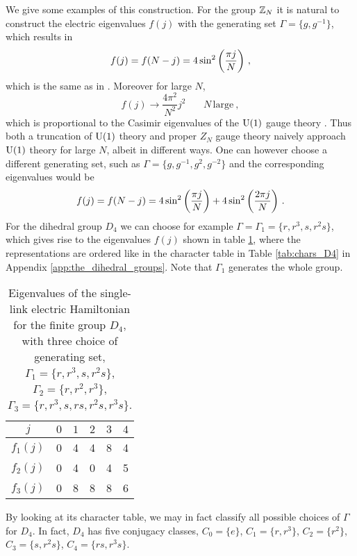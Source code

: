 We give some examples of this construction.
For the group $\mathbb{Z}_N$ it is natural to construct the electric eigenvalues $f(j)$ with the generating set $\Gamma = \{g, g^{-1}\}$, which results in
\begin{equation}
    \label{eq:fj ZN}
    f(j)=f(N-j) = 4\sin^2\pqty{\frac{\pi j}{N}} \ ,
\end{equation}
which is the same as in \cite{Ercoetal1}.
Moreover for large $N$,
\begin{equation}
    f(j) \to \frac{4\pi^2}{N^2} j^2\,\,\,\,\,\,\,\,\,\,\,N\,\mathrm{large} \ ,
\end{equation}
which is proportional to the Casimir eigenvalues of the $\mathrm{U}(1)$ gauge theory \cite{Ercoetal2}.
Thus both a truncation of $\mathrm{U}(1)$ theory and proper $Z_N$ gauge theory naively approach $\mathrm{U}(1)$ theory for large $N$, albeit in different ways.
One can however choose a different generating set, such as $\Gamma = \{g, g^{-1},g^2, g^{-2}\}$ and the corresponding eigenvalues would be
\begin{equation}
    f(j)=f(N-j) = 4\sin^2\pqty{\frac{\pi j}{N}}+4\sin^2\pqty{\frac{2\pi j}{N}} \ .
\end{equation}
For the dihedral group $D_4$ we can choose for example $\Gamma = \Gamma_1 = \{r,r^3,s,r^2s\}$, which gives rise to the eigenvalues $f(j)$  shown in table \ref{tab:fval}, where the representations are ordered like in the character table in Table \ref{tab:chars_D4} in Appendix \ref{app:the_dihedral_groups}.
Note that $\Gamma_1$ generates the whole group.
\begin{table}[h]
    \centering
    \begin{tabular}{c|ccccc}
         $j$ & $0$ & $1$ & $2$ & $3$ & $4$\\
         \hline
         $f_1(j)$ & 0 & 4 & 4 & 8 & 4 \\
         $f_2(j)$ & 0 & 4 & 0 & 4 & 5 \\
         $f_3(j)$ & 0 & 8 & 8 & 8 & 6
    \end{tabular}
    \caption{Eigenvalues of the single-link electric Hamiltonian for the finite group $D_4$, with three choice of generating set, $\Gamma_1= \{r,r^3,s,r^2s\}$, $\Gamma_2= \{r,r^2, r^3\}$, $\Gamma_3= \{r, r^3, s, rs, r^2s, r^3s\}$.}
    \label{tab:fval}
    \vspace{-3mm}
\end{table}
By looking at its character table, we may in fact classify all possible choices of $\Gamma$ for $D_4$.
In fact, $D_4$ has five conjugacy classes, $C_0 = \{e\}$, $C_1 = \{r, r^3\}$, $C_2 = \{r^2\}$, $C_3 = \{s, r^2s\}$, $C_4 = \{rs, r^3s\}$.
